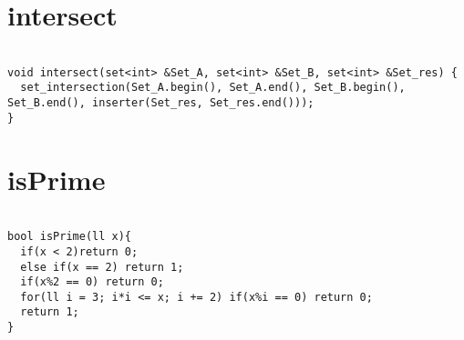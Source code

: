 \documentclass[a4j,titlepage]{jarticle} %
\begin{document}
\color{white}
\section{intersect}
\color{black}
\begin{lstlisting}[caption=intersect]

void intersect(set<int> &Set_A, set<int> &Set_B, set<int> &Set_res) {
  set_intersection(Set_A.begin(), Set_A.end(), Set_B.begin(), Set_B.end(), inserter(Set_res, Set_res.end()));
}

\end{lstlisting}

\color{white}
\section{isPrime}
\color{black}
\begin{lstlisting}[caption=isPrime]

bool isPrime(ll x){
  if(x < 2)return 0;
  else if(x == 2) return 1;
  if(x%2 == 0) return 0;
  for(ll i = 3; i*i <= x; i += 2) if(x%i == 0) return 0;
  return 1;
}

\end{lstlisting}

\color{white}
\end{document}
